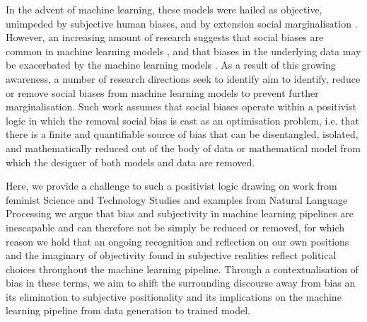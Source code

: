 In the advent of machine learning, these models were hailed as objective, unimpeded by subjective human biases, and by extension social marginalisation \cite{Oneill:2016}. However, an increasing amount of research suggests that social biases are common in machine learning models \cite{Shah:2020,Buolamwini:2018,Agarwal:2018}, and that biases in the underlying data may be exacerbated by the machine learning models \cite{Zhao:2017,Jia:2020}. As a result of this growing awareness, a number of research directions seek to identify \cite{Shah:2020,Bender-Friedman:2018,Mitchell:2019,Buolamwini:2018} aim to identify, reduce or remove social biases \cite{Zhao:2017,Agarwal:2018,Romanov:2019,Jia:2020} from machine learning models to prevent further marginalisation. Such work assumes that social biases operate within a positivist logic in which the removal social bias is cast as an optimisation problem, i.e. that there is a finite and quantifiable source of bias that can be disentangled, isolated, and mathematically reduced out of the body of data or mathematical model from which the designer of both models and data are removed.

Here, we provide a challenge to such a positivist logic drawing on work from feminist Science and Technology Studies and examples from Natural Language Processing we argue that bias and subjectivity in machine learning pipelines are inescapable and can therefore not be simply be reduced or removed, for which reason we hold that an ongoing recognition and reflection on our own positions and the imaginary of objectivity found in subjective realities reflect political choices throughout the machine learning pipeline. Through a contextualisation of bias in these terms, we aim to shift the surrounding discourse away from bias an its elimination to subjective positionality and its implications on the machine learning pipeline from data generation to trained model.


